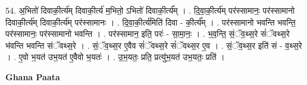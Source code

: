 \documentclass[17pt]{extarticle}
\begin{document}
54. अ॒भितो॑ दिवाकी॒र्त्य॑म् दिवाकी॒र्त्य॑ म॒भितो॒ ऽभितो॑ दिवाकी॒र्त्य᳚म् । . दि॒वा॒की॒र्त्य॑म् पर॑स्सामानः॒ पर॑स्सामानो दिवाकी॒र्त्य॑म् दिवाकी॒र्त्य॑म् पर॑स्सामानः । . दि॒वा॒की॒र्त्य॑मिति॑ दिवा - की॒र्त्य᳚म् । . पर॑स्सामानो भवन्ति भवन्ति॒ पर॑स्सामानः॒ पर॑स्सामानो भवन्ति । . पर॑स्सामान॒ इति॒ परः॑ - सा॒मा॒नः॒ । . भ॒व॒न्ति॒ सं॒ॅव॒थ्स॒रे सं॑ॅवथ्स॒रे भ॑वन्ति भवन्ति संॅवथ्स॒रे । . सं॒ॅव॒थ्स॒र ए॒वैव सं॑ॅवथ्स॒रे सं॑ॅवथ्स॒र ए॒व । . सं॒ॅव॒थ्स॒र इति॑ सं - व॒थ्स॒रे । . ए॒वो भ॒यत॑ उभ॒यत॑ ए॒वैवो भ॒यतः॑ । . उ॒भ॒यतः॒ प्रति॒ प्रत्यु॑भ॒यत॑ उभ॒यतः॒ प्रति॑ । \newline

\textbf{Ghana Paata } \newline
\end{document}
